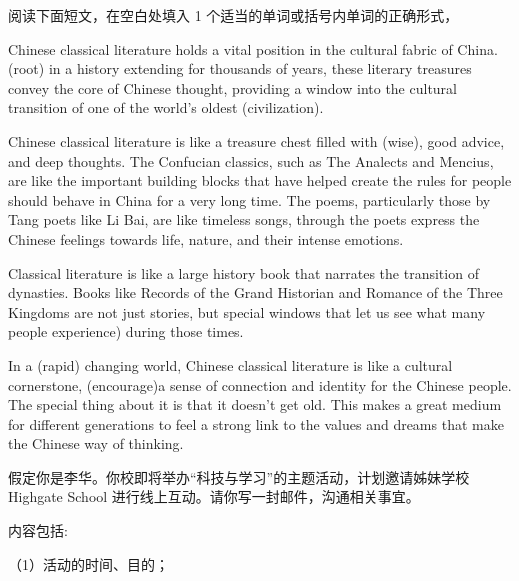 \documentclass{英语试卷}
\begin{document}
\par 阅读下面短文，在空白处填入 1 个适当的单词或括号内单词的正确形式，\par
\par Chinese classical literature holds a vital position in the cultural fabric of China.  (root) in a history extending for thousands of years, these literary treasures convey the core of Chinese thought, providing a window into the cultural transition of one of the world's oldest  (civilization).\par
\par Chinese classical literature is like a treasure chest filled with  (wise), good advice, and deep thoughts. The Confucian classics, such as The Analects and Mencius, are like the important building blocks that have helped create the rules for  people should behave in China for a very long time. The poems, particularly those by Tang poets like Li Bai, are like timeless songs, through  the poets express the Chinese feelings towards life, nature, and their intense emotions.\par
\par Classical literature is like a large history book that narrates the transition of dynasties. Books like Records of the Grand Historian and Romance of the Three Kingdoms are not just stories, but special windows that let us see what many people  experience) during those times.\par
\par In a  (rapid) changing world, Chinese classical literature is like a cultural cornerstone,  (encourage)a sense of connection and identity for the Chinese people. The special thing about it is that it doesn't get old. This makes  a great medium for different generations to feel a strong link to the values and dreams that make  the Chinese way of thinking.\par
{}
\par 假定你是李华。你校即将举办“科技与学习”的主题活动，计划邀请姊妹学校 Highgate School 进行线上互动。请你写一封邮件，沟通相关事宜。\par
\par 内容包括:\par
\par （1）活动的时间、目的；\par
\end{document}
